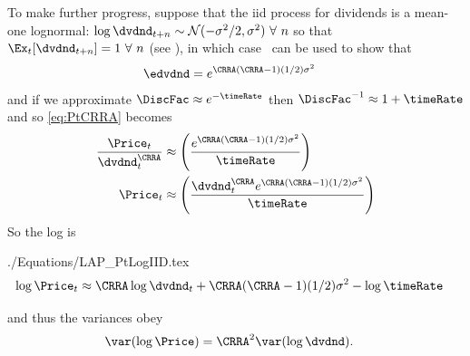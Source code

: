 \documentclass{handout}
\begin{document}
To make further progress, suppose that the iid process for dividends is a mean-one lognormal: $\log \dvdnd_{t+n} \sim \mathcal{N}(-\sigma^{2}/2,\sigma^{2})~\forall~n$ so that $\Ex_{t}[\dvdnd_{t+n}]=1~\forall~n$ (see \ELogNormMeanOne), in which case \ELogNormTimes~can be used to show that
\begin{equation}\begin{gathered}\begin{aligned}
 \edvdnd & =  e^{\CRRA(\CRRA-1)(1/2)\sigma^{2}} \label{eq:edvdndSimple}
\end{aligned}\end{gathered}\end{equation}
and if we approximate $\DiscFac \approx e^{-\timeRate}$ then $\DiscFac^{-1} \approx 1+\timeRate$ and so \eqref{eq:PtCRRA} becomes
\begin{equation*}\begin{gathered}\begin{aligned}
  \frac{\Price_{t}}{\dvdnd_{t}^{\CRRA}} %
 & \approx  \left(\frac{e^{\CRRA(\CRRA-1)(1/2)\sigma^{2}}}{\timeRate}\right)
\\ \Price_{t} & \approx  \left(\frac{\dvdnd_{t}^{\CRRA} e^{\CRRA(\CRRA-1)(1/2)\sigma^{2}}}{\timeRate}\right)
\end{aligned}\end{gathered}\end{equation*}
So the log is
\begin{verbatimwrite}{./Equations/LAP_PtLogIID.tex}
\begin{equation}\begin{gathered}\begin{aligned}
  \log \Price_{t} & \approx  \CRRA \log \dvdnd_{t} + \CRRA(\CRRA-1)(1/2)\sigma^{2} - \log \timeRate \label{eq:PtLogIID}
\end{aligned}\end{gathered}\end{equation}
\end{verbatimwrite}

and thus the variances obey
\begin{equation}\begin{gathered}\begin{aligned}
  \label{eq:varLogPvsLogd}
  \var({\log \Price}) & =  \CRRA^{2} \var(\log \dvdnd)
.
\end{aligned}\end{gathered}\end{equation}
\end{document}

